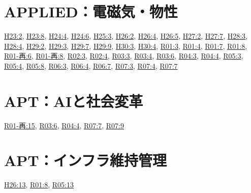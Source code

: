 \section{APPLIED：電磁気・物性}
\hyperref[q:h23-reg-applied-02]{H23:2}, \hyperref[q:h23-reg-applied-08]{H23:8}, \hyperref[q:h24-reg-applied-04]{H24:4}, \hyperref[q:h24-reg-applied-06]{H24:6}, \hyperref[q:h25-reg-applied-03]{H25:3}, \hyperref[q:h26-reg-applied-02]{H26:2}, \hyperref[q:h26-reg-applied-04]{H26:4}, \hyperref[q:h26-reg-applied-05]{H26:5}, \hyperref[q:h27-reg-applied-02]{H27:2}, \hyperref[q:h27-reg-applied-07]{H27:7}, \hyperref[q:h28-reg-applied-03]{H28:3}, \hyperref[q:h28-reg-applied-04]{H28:4}, \hyperref[q:h29-reg-applied-02]{H29:2}, \hyperref[q:h29-reg-applied-03]{H29:3}, \hyperref[q:h29-reg-applied-07]{H29:7}, \hyperref[q:h29-reg-applied-09]{H29:9}, \hyperref[q:h30-reg-applied-03]{H30:3}, \hyperref[q:h30-reg-applied-04]{H30:4}, \hyperref[q:r01-reg-applied-03]{R01:3}, \hyperref[q:r01-reg-applied-04]{R01:4}, \hyperref[q:r01-reg-applied-07]{R01:7}, \hyperref[q:r01-reg-applied-08]{R01:8}, \hyperref[q:r01-ret-applied-06]{R01-再:6}, \hyperref[q:r01-ret-applied-08]{R01-再:8}, \hyperref[q:r02-reg-applied-03]{R02:3}, \hyperref[q:r02-reg-applied-04]{R02:4}, \hyperref[q:r03-reg-applied-03]{R03:3}, \hyperref[q:r03-reg-applied-04]{R03:4}, \hyperref[q:r03-reg-applied-06]{R03:6}, \hyperref[q:r04-reg-applied-03]{R04:3}, \hyperref[q:r04-reg-applied-04]{R04:4}, \hyperref[q:r05-reg-applied-03]{R05:3}, \hyperref[q:r05-reg-applied-04]{R05:4}, \hyperref[q:r05-reg-applied-08]{R05:8}, \hyperref[q:r06-reg-applied-03]{R06:3}, \hyperref[q:r06-reg-applied-04]{R06:4}, \hyperref[q:r06-reg-applied-07]{R06:7}, \hyperref[q:r07-reg-applied-03]{R07:3}, \hyperref[q:r07-reg-applied-04]{R07:4}, \hyperref[q:r07-reg-applied-07]{R07:7}
\section{APT：AIと社会変革}
\hyperref[q:r01-ret-apt-15]{R01-再:15}, \hyperref[q:r03-reg-apt-06]{R03:6}, \hyperref[q:r04-reg-apt-04]{R04:4}, \hyperref[q:r07-reg-apt-07]{R07:7}, \hyperref[q:r07-reg-apt-09]{R07:9}
\section{APT：インフラ維持管理}
\hyperref[q:h26-reg-apt-13]{H26:13}, \hyperref[q:r01-reg-apt-08]{R01:8}, \hyperref[q:r05-reg-apt-13]{R05:13}
